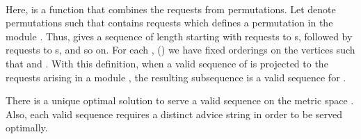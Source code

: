 \footnotesize{\hspace{-.45cm}
}\\
\normalsize

Here,  is a function that combines the requests from  permutations. Let  denote  permutations such that  
contains  requests  which defines a permutation in the module . Thus,  gives a sequence of length  starting with  requests to s, followed 
by  requests to s, and so on. For each , () we have fixed orderings on the vertices such that  and . With this definition, when a valid sequence of  is projected to the requests arising in a module , the resulting subsequence is a valid sequence for . 

\begin{lemma} \label{khast}
There is a unique optimal solution to serve a valid sequence on the metric space . Also, each valid sequence requires a distinct advice string in order to be served optimally.
\end{lemma} 

